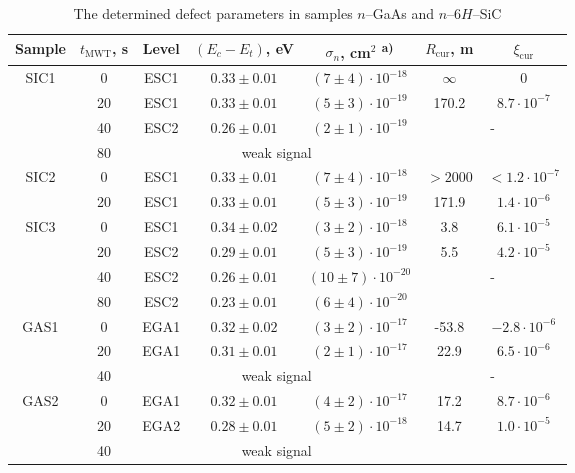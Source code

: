 \documentclass[final,3p,times,twocolumn,authoryear]{elsarticle}
\begin{document}
\begin{table}
\caption{\label{tabMW}
The determined defect parameters in samples $n$--GaAs and $n$--6$H$--SiC
}
\center
\begin{tabular}{ccccccc}
\hline
Sample& $t_\mathrm{MWT}$, s &Level &$(E_c-E_t)$, eV &$\sigma_n$, cm$^2$\textsuperscript{ a)}&$R_\mathrm{cur}$, m&$\xi_\mathrm{cur}$\\
\hline
SIC1& 0 &ESC1& $0.33\pm0.01$ &$(7\pm4)\cdot10^{-18}$&$\infty$&0\\ %
& 20 &ESC1& $0.33\pm0.01$ &$(5\pm3)\cdot10^{-19}$&170.2&$8.7\cdot10^{-7}$\\ %
& 40 &ESC2& $0.26\pm0.01$ &$(2\pm1)\cdot10^{-19}$&\multicolumn{2}{c}{\multirow{2}{*}{-}}\\ %
& 80 & \multicolumn{3}{c}{weak signal}&\multicolumn{2}{c}{}\\ %
SIC2& 0 &ESC1& $0.33\pm0.01$ &$(7\pm4)\cdot10^{-18}$&$>2000$&$<1.2\cdot10^{-7}$\\ %
& 20 &ESC1& $0.33\pm0.01$ &$(5\pm3)\cdot10^{-19}$&171.9&$1.4\cdot10^{-6}$\\ %
SIC3& 0 &ESC1& $0.34\pm0.02$ &$(3\pm2)\cdot10^{-18}$&3.8&$6.1\cdot10^{-5}$\\ %
& 20 &ESC2&$0.29\pm0.01$ &$(5\pm3)\cdot10^{-19}$&5.5&$4.2\cdot10^{-5}$\\ %
& 40 &ESC2& $0.26\pm0.01$ &$(10\pm7)\cdot10^{-20}$&\multicolumn{2}{c}{\multirow{2}{*}{-}}\\ %
& 80 &ESC2& $0.23\pm0.01$ &$(6\pm4)\cdot10^{-20}$&\multicolumn{2}{c}{}\\ %
GAS1& 0 &EGA1& $0.32\pm0.02$ &$(3\pm2)\cdot10^{-17}$&-53.8&$-2.8\cdot10^{-6}$\\ %
& 20 &EGA1& $0.31\pm0.01$ &$(2\pm1)\cdot10^{-17}$&22.9&$6.5\cdot10^{-6}$\\ %
& 40 & \multicolumn{3}{c}{weak signal}&\multicolumn{2}{c}{-}\\ %
GAS2& 0 &EGA1& $0.32\pm0.01$ &$(4\pm2)\cdot10^{-17}$&17.2&$8.7\cdot10^{-6}$\\ %
& 20 &EGA2& $0.28\pm0.01$ &$(5\pm2)\cdot10^{-18}$&14.7&$1.0\cdot10^{-5}$\\ %
& 40 & \multicolumn{3}{c}{weak signal}&\multicolumn{2}{c}{}\\ %

\end{tabular}
\end{table}
\end{document}
